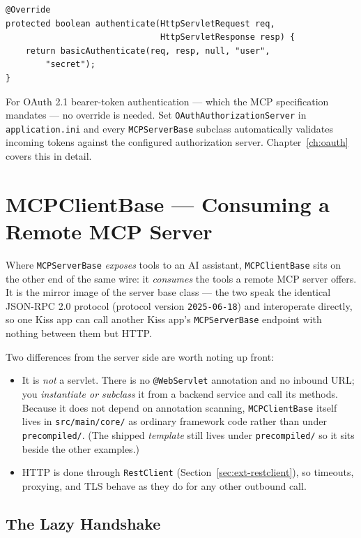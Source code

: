 \begin{lstlisting}[style=java]
@Override
protected boolean authenticate(HttpServletRequest req,
                               HttpServletResponse resp) {
    return basicAuthenticate(req, resp, null, "user",
        "secret");
}
\end{lstlisting}

\noindent
For OAuth 2.1 bearer-token authentication --- which the MCP specification mandates --- no override is needed.  Set \texttt{OAuthAuthorizationServer} in \texttt{application.ini} and every \texttt{MCPServerBase} subclass automatically validates incoming tokens against the configured authorization server.  Chapter~\ref{ch:oauth} covers this in detail.

\section{MCPClientBase --- Consuming a Remote MCP Server}
\label{sec:ext-mcpclientbase}

Where \texttt{MCPServerBase} \emph{exposes} tools to an AI assistant, \texttt{MCPClientBase} sits on the other end of the same wire: it \emph{consumes} the tools a remote MCP server offers.  It is the mirror image of the server base class --- the two speak the identical JSON-RPC 2.0 protocol (protocol version \texttt{2025-06-18}) and interoperate directly, so one Kiss app can call another Kiss app's \texttt{MCPServerBase} endpoint with nothing between them but HTTP.

Two differences from the server side are worth noting up front:

\begin{itemize}
  \item It is \emph{not} a servlet.  There is no \texttt{@WebServlet} annotation and no inbound URL; you \emph{instantiate or subclass} it from a backend service and call its methods.  Because it does not depend on annotation scanning, \texttt{MCPClientBase} itself lives in \texttt{src/main/core/} as ordinary framework code rather than under \texttt{precompiled/}.  (The shipped \emph{template} still lives under \texttt{precompiled/} so it sits beside the other examples.)
  \item HTTP is done through \texttt{RestClient} (Section~\ref{sec:ext-restclient}), so timeouts, proxying, and TLS behave as they do for any other outbound call.
\end{itemize}

\subsection{The Lazy Handshake}

